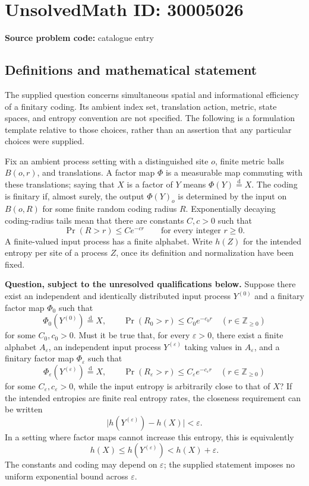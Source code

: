 \documentclass[11pt]{article}
\newcommand{\Z}{\mathbb{Z}}
\begin{document}
\section*{UnsolvedMath ID: 30005026}
\textbf{Source problem code:} catalogue entry
\subsection{Definitions and mathematical statement}
The supplied question concerns simultaneous spatial and informational efficiency of a finitary coding. Its ambient index set, translation action, metric, state spaces, and entropy convention are not specified. The following is a formulation template relative to those choices, rather than an assertion that any particular choices were supplied.

Fix an ambient process setting with a distinguished site \(o\), finite metric balls \(B(o,r)\), and translations. A factor map \(\Phi\) is a measurable map commuting with these translations; saying that \(X\) is a factor of \(Y\) means \(\Phi(Y)\stackrel{\mathrm d}=X\). The coding is finitary if, almost surely, the output \(\Phi(Y)_o\) is determined by the input on \(B(o,R)\) for some finite random coding radius \(R\). Exponentially decaying coding-radius tails mean that there are constants \(C,c>0\) such that
\[
\Pr(R>r)\le C e^{-cr}\qquad\text{for every integer }r\ge0.
\]
A finite-valued input process has a finite alphabet. Write \(h(Z)\) for the intended entropy per site of a process \(Z\), once its definition and normalization have been fixed.

\textbf{Question, subject to the unresolved qualifications below.} Suppose there exist an independent and identically distributed input process \(Y^{(0)}\) and a finitary factor map \(\Phi_0\) such that
\[
\Phi_0(Y^{(0)})\stackrel{\mathrm d}=X,
\qquad
\Pr(R_0>r)\le C_0e^{-c_0r}
\quad(r\in\Z_{\ge0})
\]
for some \(C_0,c_0>0\). Must it be true that, for every \(\varepsilon>0\), there exist a finite alphabet \(A_\varepsilon\), an independent input process \(Y^{(\varepsilon)}\) taking values in \(A_\varepsilon\), and a finitary factor map \(\Phi_\varepsilon\) such that
\[
\Phi_\varepsilon(Y^{(\varepsilon)})\stackrel{\mathrm d}=X,
\qquad
\Pr(R_\varepsilon>r)\le C_\varepsilon e^{-c_\varepsilon r}
\quad(r\in\Z_{\ge0})
\]
for some \(C_\varepsilon,c_\varepsilon>0\), while the input entropy is arbitrarily close to that of \(X\)? If the intended entropies are finite real entropy rates, the closeness requirement can be written
\[
\bigl|h(Y^{(\varepsilon)})-h(X)\bigr|<\varepsilon.
\]
In a setting where factor maps cannot increase this entropy, this is equivalently
\[
h(X)\le h(Y^{(\varepsilon)})<h(X)+\varepsilon.
\]
The constants and coding may depend on \(\varepsilon\); the supplied statement imposes no uniform exponential bound across \(\varepsilon\).
\end{document}
